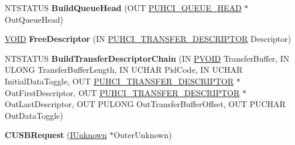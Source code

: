 \begin{DoxyCompactItemize}
\item 
\mbox{\label{class_c_u_s_b_request_a43b621e00e96b1efda382abd61783645}} 
N\+T\+S\+T\+A\+T\+US {\bfseries Build\+Queue\+Head} (O\+UT \hyperlink{struct___u_h_c_i___q_u_e_u_e___h_e_a_d}{P\+U\+H\+C\+I\+\_\+\+Q\+U\+E\+U\+E\+\_\+\+H\+E\+AD} $\ast$Out\+Queue\+Head)
\item 
\mbox{\label{class_c_u_s_b_request_a71b62e2d0e9c72bff600fa97f352c2f5}} 
\hyperlink{interfacevoid}{V\+O\+ID} {\bfseries Free\+Descriptor} (IN \hyperlink{struct___u_h_c_i___t_r_a_n_s_f_e_r___d_e_s_c_r_i_p_t_o_r}{P\+U\+H\+C\+I\+\_\+\+T\+R\+A\+N\+S\+F\+E\+R\+\_\+\+D\+E\+S\+C\+R\+I\+P\+T\+OR} Descriptor)
\item 
\mbox{\label{class_c_u_s_b_request_a2930a4e9997f47c446cb75a209c1cfc8}} 
N\+T\+S\+T\+A\+T\+US {\bfseries Build\+Transfer\+Descriptor\+Chain} (IN \hyperlink{interfacevoid}{P\+V\+O\+ID} Transfer\+Buffer, IN U\+L\+O\+NG Transfer\+Buffer\+Length, IN U\+C\+H\+AR Pid\+Code, IN U\+C\+H\+AR Initial\+Data\+Toggle, O\+UT \hyperlink{struct___u_h_c_i___t_r_a_n_s_f_e_r___d_e_s_c_r_i_p_t_o_r}{P\+U\+H\+C\+I\+\_\+\+T\+R\+A\+N\+S\+F\+E\+R\+\_\+\+D\+E\+S\+C\+R\+I\+P\+T\+OR} $\ast$Out\+First\+Descriptor, O\+UT \hyperlink{struct___u_h_c_i___t_r_a_n_s_f_e_r___d_e_s_c_r_i_p_t_o_r}{P\+U\+H\+C\+I\+\_\+\+T\+R\+A\+N\+S\+F\+E\+R\+\_\+\+D\+E\+S\+C\+R\+I\+P\+T\+OR} $\ast$Out\+Last\+Descriptor, O\+UT P\+U\+L\+O\+NG Out\+Transfer\+Buffer\+Offset, O\+UT P\+U\+C\+H\+AR Out\+Data\+Toggle)
\item 
\mbox{\label{class_c_u_s_b_request_a059d235428707fc6b43d4402b6f6fe52}} 
{\bfseries C\+U\+S\+B\+Request} (\hyperlink{interface_i_unknown}{I\+Unknown} $\ast$Outer\+Unknown)
\end{DoxyCompactItemize}
